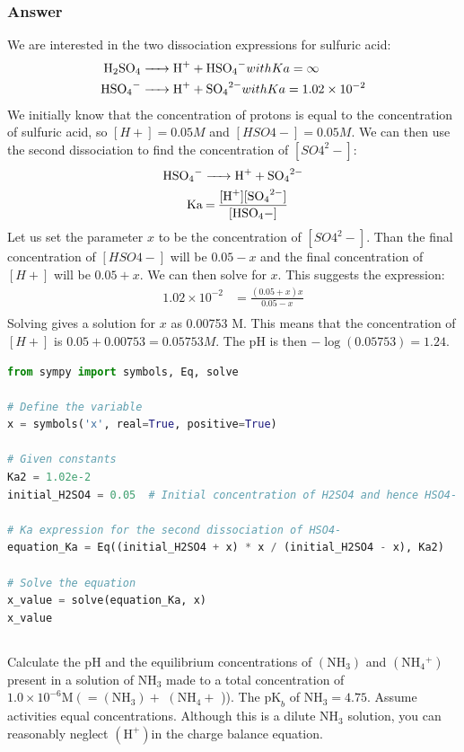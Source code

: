 \documentclass[12pt]{article}
\begin{document}
\subsubsection{Answer}
We are interested in the two dissociation expressions for sulfuric acid:
\begin{align*}
  \ce{H2SO4 &-> H+ + HSO4-} with Ka = \infty \\
  \ce{HSO4- &-> H+ + SO4^2-} with Ka = 1.02 \times 10^{-2}
\end{align*}
We initially know that the concentration of protons is equal to the concentration of sulfuric acid, so $[H+] = 0.05 M$ and $[HSO4-] = 0.05 M$. We can then use the second dissociation to find the concentration of $[SO4^2-]$:
\begin{align*}
  \ce{HSO4- &-> H+ + SO4^2-} \\
  \ce{Ka & = \frac{[H+][SO4^2-]}{[HSO4-]}} \\
\end{align*}
Let us set the parameter $x$ to be the concentration of $[SO4^2-]$. Than the final concentration of $[HSO4-]$ will be $0.05 - x$ and the final concentration of $[H+]$ will be $0.05 + x$. We can then solve for $x$. This suggests the expression:
\begin{align*}
  1.02 \times 10^{-2} & = \frac{(0.05 + x)x}{0.05 - x} \\
\end{align*}
Solving gives a solution for $x$ as 0.00753 M. This means that the concentration of $[H+]$ is $0.05 + 0.00753 = 0.05753 M$. The $\mathrm{pH}$ is then $-\log(0.05753) = 1.24$.
\begin{lstlisting}[language=Python]
from sympy import symbols, Eq, solve

# Define the variable
x = symbols('x', real=True, positive=True)

# Given constants
Ka2 = 1.02e-2
initial_H2SO4 = 0.05  # Initial concentration of H2SO4 and hence HSO4-

# Ka expression for the second dissociation of HSO4-
equation_Ka = Eq((initial_H2SO4 + x) * x / (initial_H2SO4 - x), Ka2)

# Solve the equation
x_value = solve(equation_Ka, x)
x_value
\end{lstlisting}
\subsection{}
Calculate the $\mathrm{pH}$ and the equilibrium concentrations of $\left(\mathrm{NH}_{3}\right)$ and $\left(\mathrm{NH}_{4}{ }^{+}\right)$ present in a solution of $\mathrm{NH}_{3}$ made to a total concentration of $1.0 \times 10^{-6} \mathrm{M}\left(=\left(\mathrm{NH}_{3}\right)+\right.$ $\left(\mathrm{NH}_{4}+\right.$ )). The $\mathrm{pK}_{b}$ of $\mathrm{NH}_{3}=4.75$. Assume activities equal concentrations. Although this is a dilute $\mathrm{NH}_{3}$ solution, you can reasonably neglect $\left(\mathrm{H}^{+}\right)$in the charge balance equation.
\end{document}
